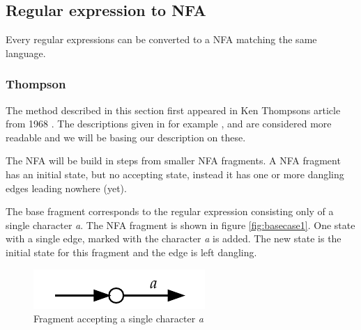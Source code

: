 \subsection{Regular expression to NFA}
\label{sec:from_regular_expression_to_nfa}
Every regular expressions can be converted to a NFA matching the same
language. 

\subsubsection{Thompson}
\label{sec:re2nfa_thompson_theory}
The method described in this section first appeared in Ken Thompsons
article from 1968 \cite{Thompson1968}. The descriptions given in for
example \cite{HopcroftJohnE.AndMotwaniRajeevAndUllman2001},
\cite{Aho:1986:CPT:6448} and \cite{RussCox} are considered more
readable and we will be basing our description on these.

The NFA will be build in steps from smaller NFA fragments. A NFA
fragment has an initial state, but no accepting state, instead it has
one or more dangling edges leading nowhere (yet).



The base fragment corresponds to the regular expression consisting
only of a single character \textit{a}. The NFA fragment is shown in
figure \vref{fig:basecase1}. One state with a single edge, marked with
the character \textit{a} is added. The new state is the initial state
for this fragment and the edge is left dangling.

\begin{figure}
  \centering
  \includegraphics{parsing/basecase1}
  \caption{Fragment accepting a single character \textit{a}}
  \label{fig:basecase1}
\end{figure}

